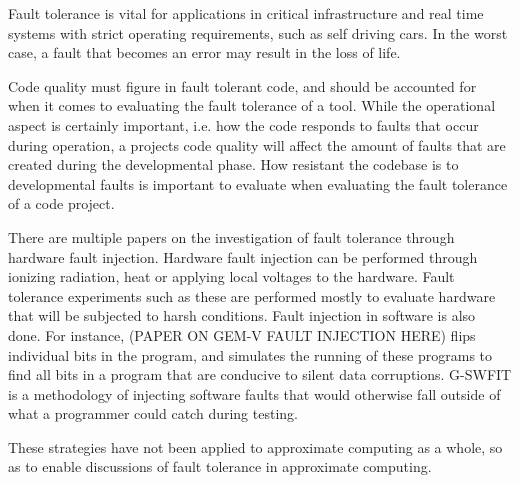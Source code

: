 Fault tolerance is vital for applications in critical infrastructure and real time systems with strict operating requirements, such as self driving cars. In the worst case, a fault that becomes an error may result in the loss of life. 

Code quality must figure in fault tolerant code, and should be accounted for when it comes to evaluating the fault tolerance of a tool. While the operational aspect is certainly important, i.e. how the code responds to faults that occur during operation, a projects code quality will affect the amount of faults that are created during the developmental phase. How resistant the codebase is to developmental faults is important to evaluate when evaluating the fault tolerance of a code project.

There are multiple papers on the investigation of fault tolerance through hardware fault injection. Hardware fault injection can be performed through ionizing radiation, heat or applying local voltages to the hardware. Fault tolerance experiments such as these are performed mostly to evaluate hardware that will be subjected to harsh conditions. 
Fault injection in software is also done. For instance, (PAPER ON GEM-V FAULT INJECTION HERE) flips individual bits in the program, and simulates the running of these programs to find all bits in a program that are conducive to silent data corruptions.  G-SWFIT is a methodology of injecting software faults that would otherwise fall outside of what a programmer could catch during testing. 

These strategies have not been applied to approximate computing as a whole, so as to enable discussions of fault tolerance in approximate computing.